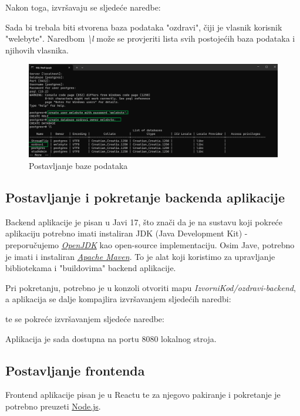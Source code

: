 			Nakon toga, izvršavaju se sljedeće naredbe:
			

			Sada bi trebala biti stvorena baza podataka "ozdravi", čiji je vlasnik korisnik "welebyte". Naredbom \textit{\textbackslash l} može se provjeriti lista svih postojećih 
			baza podataka i njihovih vlasnika.
			\begin{figure}[H]
				\includegraphics[width=\textwidth]{slike/sqlshell2.png} 
				\caption{Postavljanje baze podataka} 
			\end{figure}
	
			\subsection*{Postavljanje i pokretanje backenda aplikacije}
			Backend aplikacije je pisan u Javi 17, što znači da je na sustavu koji pokreće aplikaciju potrebno imati instaliran JDK (Java Development Kit) - preporučujemo \href{https://www.openjdk.org}{\textit{OpenJDK}} kao open-source implementaciju.
			Osim Jave, potrebno je imati i instaliran \href{https://maven.apache.org/download.cgi}{\textit{Apache Maven}}. To je alat koji koristimo za upravljanje bibliotekama i "buildovima" backend aplikacije.
			
			Pri pokretanju, potrebno je u konzoli otvoriti mapu \textit{IzvorniKod/ozdravi-backend}, a aplikacija se dalje kompajlira izvršavanjem sljedećih naredbi:
			

			te se pokreće izvršavanjem sljedeće naredbe: 
			
			
			Aplikacija je sada dostupna na portu 8080 lokalnog stroja.

			\subsection*{Postavljanje frontenda}
			Frontend aplikacije pisan je u Reactu te za njegovo pakiranje i pokretanje je potrebno preuzeti \href{https://nodejs.org/en/download/}{Node.js}.

